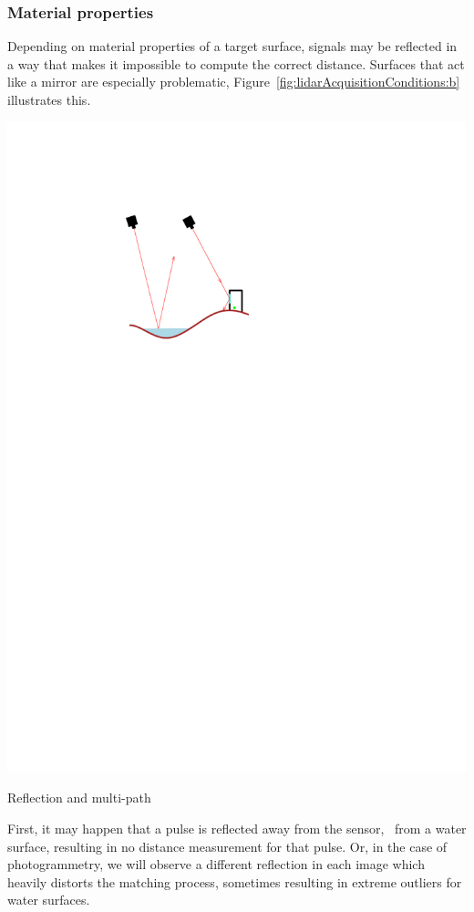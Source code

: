 \subsubsection{Material properties}
Depending on material properties of a target surface, signals may be reflected in a way that makes it impossible to compute the correct distance. 
Surfaces that act like a mirror are especially problematic, Figure~\ref{fig:lidarAcquisitionConditions:b} illustrates this. 
\begin{marginfigure}
	\centering
	\includegraphics[width=\textwidth,page=1]{figs/lidarAcq.pdf}
	\caption{Reflection and multi-path}%
	\label{fig:lidarAcquisitionConditions:b}
\end{marginfigure}
First, it may happen that a pulse is reflected away from the sensor, \eg\ from a water surface, resulting in no distance measurement for that pulse. 
Or, in the case of photogrammetry, we will observe a different reflection in each image which heavily distorts the matching process, sometimes resulting in extreme outliers for water surfaces.  
